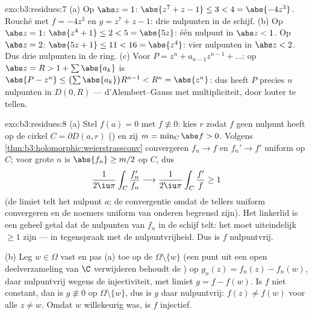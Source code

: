 \begin{solution}{exo:b3:residues:7}
(a) Op $\abs z = 1$: $\abs{z^7 + z - 1} \leq 3 < 4 =
\abs{-4z^3}$. Rouché met $f = -4z^3$ en $g = z^7 + z - 1$: drie
nulpunten in de schijf.
(b) Op $\abs z = 1$: $\abs{z^4 + 1} \leq 2 < 5 = \abs{5z}$: één
nulpunt in $\abs z < 1$. Op $\abs z = 2$: $\abs{5z + 1} \leq 11 <
16 = \abs{z^4}$: vier nulpunten in $\abs z < 2$. Dus drie
nulpunten in de ring.
(c) Voor $P = z^n + a_{n-1}z^{n-1} + \dots$: op $\abs z = R > 1 +
\sum\abs{a_k}$ is $\abs{P - z^n} \leq
\bigl(\sum\abs{a_k}\bigr)R^{n-1} < R^n = \abs{z^n}$: dus heeft
$P$ precies $n$ nulpunten in $D(0, R)$ --- d'Alembert--Gauss met
multipliciteit, door louter te tellen.
\end{solution}

\begin{solution}{exo:b3:residues:8}
(a) Stel $f(a) = 0$ met $f \not\equiv 0$: kies $r$ zodat $f$ geen
nulpunt heeft op de cirkel $C = \partial D(a, r)$ () en zij $m = \min_C\abs f > 0$. Volgens
\cref{thm:b3:holomorphic:weierstrassconv} convergeren $f_n \to f$
en $f_n' \to f'$ uniform op $C$; voor grote $n$ is $\abs{f_n}
\geq m/2$ op $C$, dus
\[
\frac1{2\iu\pi}\int_C\frac{f_n'}{f_n}
\longrightarrow \frac1{2\iu\pi}\int_C\frac{f'}{f} \geq 1
\]
(de limiet telt het nulpunt $a$; de convergentie omdat de tellers
uniform convergeren en de noemers uniform van onderen begrensd
zijn). Het linkerlid is een geheel getal dat de nulpunten van
$f_n$ in de schijf telt: het moet uiteindelijk $\geq 1$ zijn ---
in tegenspraak met de nulpuntvrijheid. Dus is $f$ nulpuntvrij.

(b) Leg $w \in \Omega$ vast en pas (a) toe op de 
 $\Omega\setminus\{w\}$ (een punt uit een open
 deelverzameling van $\C$ verwijderen behoudt de
) op $g_n(z) = f_n(z) - f_n(w)$, daar nulpuntvrij wegens
de injectiviteit, met limiet $g = f - f(w)$. Is $f$ niet
constant, dan is $g \not\equiv 0$ op $\Omega\setminus\{w\}$, dus
is $g$ daar nulpuntvrij: $f(z) \neq f(w)$ voor alle $z \neq w$.
Omdat $w$ willekeurig was, is $f$ injectief.
\end{solution}


